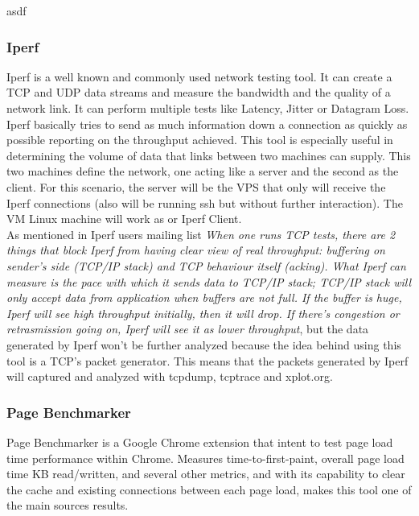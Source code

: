 asdf

\subsubsection{Iperf}
Iperf is a well known and commonly used network testing tool. It can create a
TCP and UDP data streams and measure the bandwidth and the quality of a network
link. It can perform multiple tests like Latency, Jitter or Datagram Loss.\\

Iperf basically tries to send as much information down a connection as quickly
as possible reporting on the throughput achieved. This tool is especially useful
in determining the volume of data that links between two machines can supply.
This two machines define the network, one acting like a server and the second as
the client. For this scenario, the server will be the VPS that only will receive
the Iperf connections (also will be running ssh but without further
interaction). The VM Linux machine will work as or Iperf Client.\\  

As mentioned in Iperf users mailing list \textit{
When one runs TCP tests, there are 2 things that block Iperf from having clear
view of real throughput: buffering on sender's side (TCP/IP stack) and TCP
behaviour itself (acking). What Iperf can measure is the pace with which it
sends data to TCP/IP stack; TCP/IP stack will only accept data from application
when buffers are not full. If the buffer is huge, Iperf will see high
throughput initially, then it will drop. If there's congestion or retrasmission
going on, Iperf will see it as lower throughput}\cite{iperfmaillist}, but the
data generated by Iperf won't be further analyzed because the  idea behind using
this tool is a TCP's packet generator. This means that the packets generated by 
Iperf will captured and analyzed with tcpdump, tcptrace and xplot.org.\\

\subsubsection{Page Benchmarker}

Page Benchmarker is a Google Chrome extension that intent to test page load 
time performance within Chrome. Measures time-to-first-paint, overall page load 
time KB read/written, and several other metrics, and with its capability to 
clear the cache and existing connections between each page load, makes this 
tool one of the main sources results.\\


